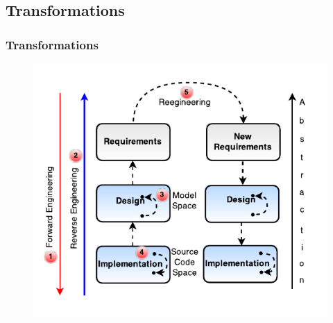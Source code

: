 \documentclass[xcolor=table]{beamer}
\begin{document}

\subsection{Transformations}
\begin{frame}
\frametitle{Transformations}
\begin{figure}[h]
\centering
\includegraphics{Figures/transformationsRE}
\end{figure}
\end{frame}
\end{document}
